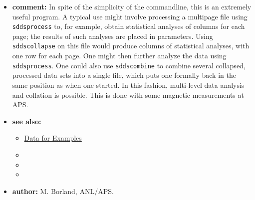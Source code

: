 \begin{itemize}
\item {\bf comment:} 
In spite of the simplicity of the commandline, this is an extremely useful program.  A typical use might
involve processing a multipage file using {\tt sddsprocess} to, for example, obtain statistical analyses of
columns for each page; the results of such analyses are placed in parameters.  Using {\tt sddscollapse} on
this file would produce columns of statistical analyses, with one row for each page.  One might then further
analyze the data using {\tt sddsprocess}.  One could also use {\tt sddscombine} to combine several collapsed,
processed data sets into a single file, which puts one formally back in the same position as when one started.
In this fashion, multi-level data analysis and collation is possible.  This is done with some magnetic
measurements at APS.
\item {\bf see also:}
    \begin{itemize}
    \item \hyperref[exampleData]{Data for Examples}
    \item {}
    \item {}
    \item {}
    \end{itemize}
\item {\bf author:} M. Borland, ANL/APS.
\end{itemize}



